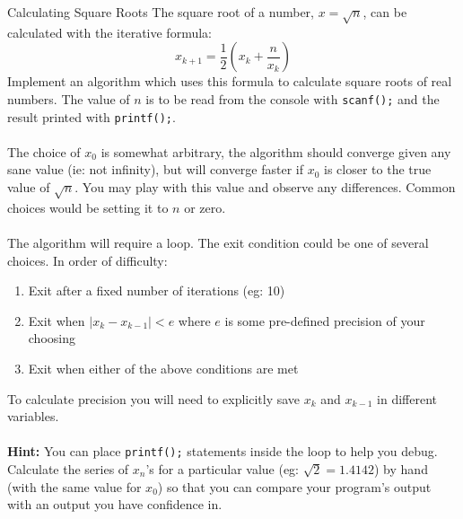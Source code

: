 \documentclass{lab}
\begin{document}
\begin{task}{Calculating Square Roots}{}
The square root of a number, $x = \sqrt{n}$, can be calculated with the iterative formula:
\begin{equation}\label{eq:sqrt}
x_{k+1} = \frac{1}{2}\left(x_k + \frac{n}{x_k}\right)
\end{equation}
Implement an algorithm which uses this formula to calculate square roots of real numbers. The value of $n$ is to be read from the console with \texttt{scanf();} and the result printed with \texttt{printf();}.
\\ \\
The choice of $x_0$ is somewhat arbitrary, the algorithm should converge given any sane value (ie: not infinity), but will converge faster if $x_0$ is closer to the true value of $\sqrt{n}$. You may play with this value and observe any differences. Common choices would be setting it to $n$ or zero.
\\ \\
The algorithm will require a loop. The exit condition could be one of several choices. In order of difficulty:
\begin{enumerate}
\item Exit after a fixed number of iterations (eg: 10)
\item Exit when $\left| x_k - x_{k-1} \right| < e$ where $e$ is some pre-defined precision of your choosing
\item Exit when either of the above conditions are met
\end{enumerate}

To calculate precision you will need to explicitly save $x_k$ and $x_{k-1}$ in different variables.
\\ \\
\textbf{Hint:} You can place \texttt{printf();} statements inside the loop to help you debug. Calculate the series of $x_n$'s for a particular value (eg: $\sqrt{2}=1.4142$) by hand (with the same value for $x_0$) so that you can compare your program's output with an output you have confidence in.
\end{task}\label{tsk:sqrt}
\end{document}
